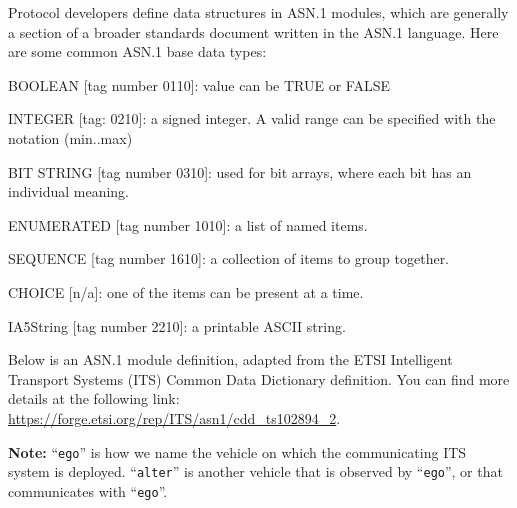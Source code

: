 \documentclass[a4paper,10pt]{article}
\begin{document}
Protocol developers define data structures in ASN.1 modules, which are generally a section of a broader standards
document written in the ASN.1 language. Here are some common ASN.1 base data types:

\begin{list}{}{ %
    \setlength{\leftmargin}{0.5cm} %
    \setlength{\itemsep}{0cm} %
}
    \item BOOLEAN [tag number 0110]: value can be TRUE or FALSE 
    \item INTEGER [tag: 0210]: a signed integer. A valid range can be specified with the notation (min..max)
    \item BIT STRING [tag number 0310]: used for bit arrays, where each bit has an individual meaning.
    \item ENUMERATED [tag number 1010]: a list of named items.
    \item SEQUENCE [tag number 1610]: a collection of items to group together.
    \item CHOICE [n/a]: one of the items can be present at a time.
    \item IA5String [tag number 2210]: a printable ASCII string.
\end{list}

Below is an ASN.1 module definition, adapted from the ETSI Intelligent Transport Systems (ITS) Common Data Dictionary definition. You can find more details at the following link: \url{https://forge.etsi.org/rep/ITS/asn1/cdd_ts102894_2}.

\textbf{Note:} “\texttt{ego}” is how we name the vehicle on which the communicating ITS system is deployed. “\texttt{alter}” is another vehicle that is observed by “\texttt{ego}”, or that communicates with “\texttt{ego}”.
\end{document}
